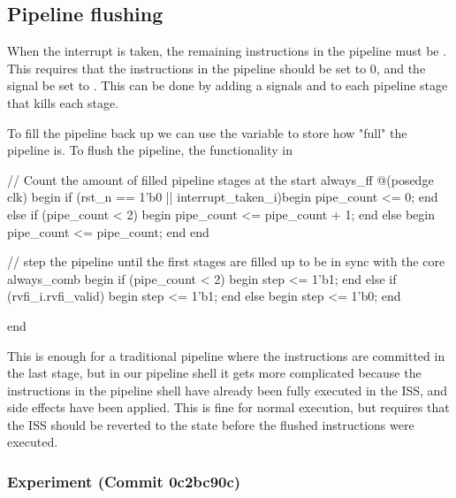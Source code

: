 \subsection{Pipeline flushing}



When the interrupt is taken, the remaining instructions in the pipeline must be . This requires that the instructions in the pipeline should be set to 0, and the  signal be set to . This can be done by adding a signals  and  to each pipeline stage that kills each stage.

To fill the pipeline back up we can use the  variable to store how "full" the pipeline is. To flush the pipeline, the functionality in 

\begin{systemverilog}[label={lst:pipe_count}, caption={Systemverilog code for filling the pipeline at the start and after a flush.}]
     // Count the amount of filled pipeline stages at the start 
    always_ff @(posedge clk) begin
        if (rst_n == 1'b0 || interrupt_taken_i)begin 
            pipe_count <= 0;
        end else if (pipe_count < 2) begin
            pipe_count <= pipe_count + 1;
        end else begin
            pipe_count <= pipe_count;
        end
    end

    // step the pipeline until the first stages are filled up to be in sync with the core
    always_comb begin
        if (pipe_count < 2) begin
            step <= 1'b1;
        end
        else if (rvfi_i.rvfi_valid) begin
            step <= 1'b1;
        end
        else begin
            step <= 1'b0;
        end

    end
\end{systemverilog}


This is enough for a traditional pipeline where the instructions are committed in the last stage, but in our pipeline shell it gets more complicated because the instructions in the pipeline shell have already been fully executed in the ISS, and side effects have been applied. This is fine for normal execution, but requires that the ISS should be reverted to the state before the flushed instructions were executed.


\subsubsection{Experiment (Commit 0c2bc90c)}

